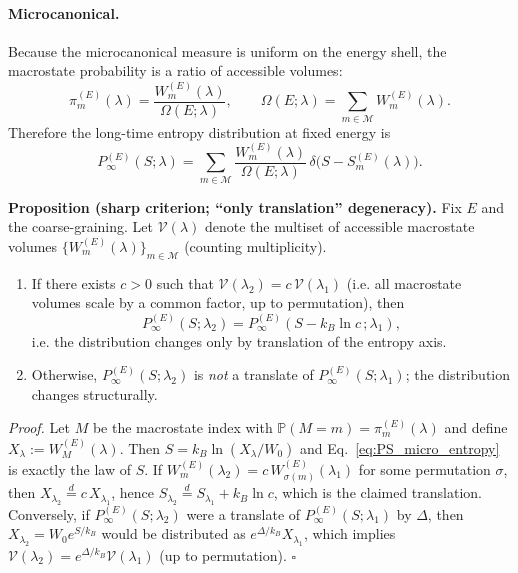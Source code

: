 \documentclass[11pt,a4paper]{article}
\begin{document}
\paragraph{Microcanonical.}
Because the microcanonical measure is uniform on the energy shell, the macrostate
probability is a ratio of accessible volumes:
\begin{equation}
\pi_m^{(E)}(\lambda)=\frac{W_m^{(E)}(\lambda)}{\Omega(E;\lambda)},
\qquad
\Omega(E;\lambda)=\sum_{m\in\mathcal{M}}W_m^{(E)}(\lambda).
\label{eq:pi_micro_entropy}
\end{equation}
Therefore the long-time entropy distribution at fixed energy is
\begin{equation}
\boxed{
P_{\infty}^{(E)}(S;\lambda)=
\sum_{m\in\mathcal{M}}
\frac{W_m^{(E)}(\lambda)}{\Omega(E;\lambda)}\,
\delta\!\bigl(S-S_m^{(E)}(\lambda)\bigr).
}
\label{eq:PS_micro_entropy}
\end{equation}

\textbf{Proposition (sharp criterion; ``only translation'' degeneracy).}
Fix $E$ and the coarse-graining. Let $\mathcal{V}(\lambda)$ denote the multiset of
accessible macrostate volumes $\{W_m^{(E)}(\lambda)\}_{m\in\mathcal{M}}$ (counting multiplicity).
\begin{enumerate}
  \item If there exists $c>0$ such that $\mathcal{V}(\lambda_2)=c\,\mathcal{V}(\lambda_1)$
  (i.e. all macrostate volumes scale by a common factor, up to permutation), then
  \[
  P_{\infty}^{(E)}(S;\lambda_2)=P_{\infty}^{(E)}\!\left(S-k_B\ln c\,;\lambda_1\right),
  \]
  i.e. the distribution changes only by translation of the entropy axis.
  \item Otherwise, $P_{\infty}^{(E)}(S;\lambda_2)$ is \emph{not} a translate of
  $P_{\infty}^{(E)}(S;\lambda_1)$; the distribution changes structurally.
\end{enumerate}

\textit{Proof.}
Let $M$ be the macrostate index with $\mathbb{P}(M=m)=\pi_m^{(E)}(\lambda)$ and define
$X_\lambda:=W_M^{(E)}(\lambda)$. Then $S=k_B\ln(X_\lambda/W_0)$ and
Eq.~\eqref{eq:PS_micro_entropy} is exactly the law of $S$.
If $W_m^{(E)}(\lambda_2)=c\,W_{\sigma(m)}^{(E)}(\lambda_1)$ for some permutation $\sigma$, then
$X_{\lambda_2}\overset{d}{=}c\,X_{\lambda_1}$, hence
$S_{\lambda_2}\overset{d}{=}S_{\lambda_1}+k_B\ln c$, which is the claimed translation.
Conversely, if $P_{\infty}^{(E)}(S;\lambda_2)$ were a translate of $P_{\infty}^{(E)}(S;\lambda_1)$ by
$\Delta$, then $X_{\lambda_2}=W_0 e^{S/k_B}$ would be distributed as $e^{\Delta/k_B}X_{\lambda_1}$,
which implies $\mathcal{V}(\lambda_2)=e^{\Delta/k_B}\mathcal{V}(\lambda_1)$ (up to permutation).
\hfill $\square$
\end{document}
